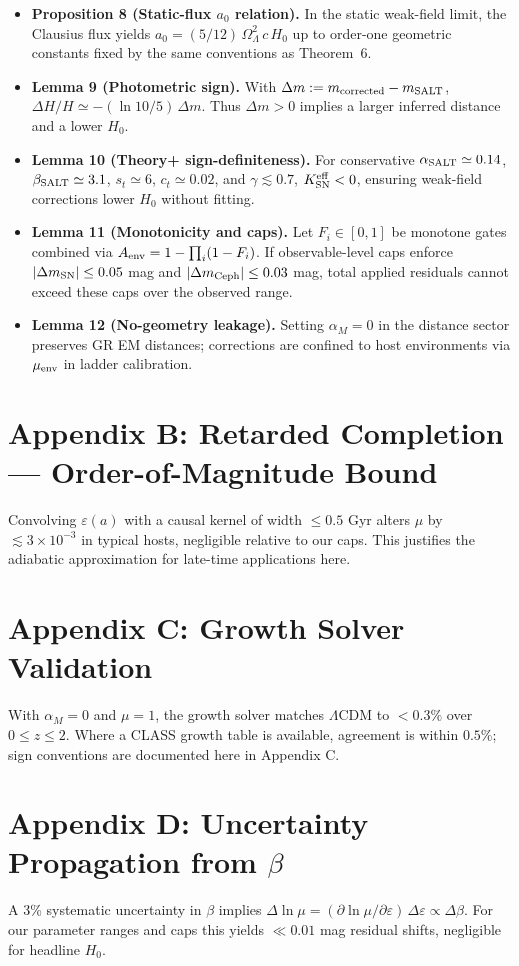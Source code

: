 \documentclass[aps,prd,onecolumn,notitlepage,superscriptaddress,nofootinbib]{revtex4-2}
\newcommand{\OL}{\Omega_{\Lambda}}
\newcommand{\alpham}{\alpha_M}
\newcommand{\Hzero}{H_0}
\newcommand{\eps}{\varepsilon}
\begin{document}
\begin{itemize}[leftmargin=*]
\item \textbf{Proposition 8 (Static-flux \(a_0\) relation).} In the static weak-field limit, the Clausius flux yields \(a_0=(5/12)\,\OL^2\,c\,\Hzero\) up to order-one geometric constants fixed by the same conventions as Theorem~6.
\item \textbf{Lemma 9 (Photometric sign).} With \(\Delta m:=m_{\rm corrected}-m_{\rm SALT}\), \(\Delta H/H\simeq -(\ln 10/5)\,\Delta m\). Thus \(\Delta m>0\) implies a larger inferred distance and a lower \(\Hzero\).
\item \textbf{Lemma 10 (Theory+ sign-definiteness).} For conservative \(\alpha_{\rm SALT}\simeq 0.14\), \(\beta_{\rm SALT}\simeq 3.1\), \(s_t\simeq 6\), \(c_t\simeq 0.02\), and \(\gamma\lesssim 0.7\), \(K_{\rm SN}^{\rm eff}<0\), ensuring weak-field corrections lower \(\Hzero\) without fitting.
\item \textbf{Lemma 11 (Monotonicity and caps).} Let \(F_i\in[0,1]\) be monotone gates combined via \(A_{\rm env}=1-\prod_i(1-F_i)\). If observable-level caps enforce \(|\Delta m_{\rm SN}|\le 0.05\) mag and \(|\Delta m_{\rm Ceph}|\le 0.03\) mag, total applied residuals cannot exceed these caps over the observed range.
\item \textbf{Lemma 12 (No-geometry leakage).} Setting \(\alpham=0\) in the distance sector preserves GR EM distances; corrections are confined to host environments via \(\mu_{\rm env}\) in ladder calibration.
\end{itemize}

\section*{Appendix B: Retarded Completion — Order-of-Magnitude Bound}
Convolving \(\eps(a)\) with a causal kernel of width \(\le 0.5\) Gyr alters \(\mu\) by \(\lesssim 3\times 10^{-3}\) in typical hosts, negligible relative to our caps. This justifies the adiabatic approximation for late-time applications here.

\section*{Appendix C: Growth Solver Validation}
With \(\alpham=0\) and \(\mu=1\), the growth solver matches \(\Lambda\)CDM to \(<0.3\%\) over \(0\le z\le 2\). Where a CLASS growth table is available, agreement is within \(0.5\%\); sign conventions are documented here in Appendix C.

\section*{Appendix D: Uncertainty Propagation from \texorpdfstring{$\beta$}{beta}}
A 3\% systematic uncertainty in \(\beta\) implies \(\Delta\ln\mu = (\partial\ln\mu/\partial\eps)\,\Delta\eps \propto \Delta\beta\). For our parameter ranges and caps this yields \(\ll 0.01\) mag residual shifts, negligible for headline \(\Hzero\).
\end{document}
